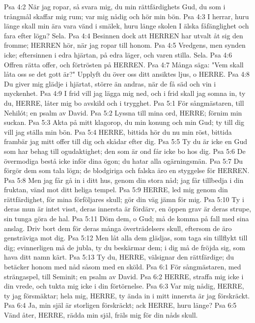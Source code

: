 Psa 4:2  När jag ropar, så svara mig, du min rättfärdighets Gud, du som i trångmål skaffar mig rum; var mig nådig och hör min bön.
Psa 4:3  I herrar, huru länge skall min ära vara vänd i smälek, huru länge skolen I älska fåfänglighet och fara efter lögn? Sela.
Psa 4:4  Besinnen dock att HERREN har utvalt åt sig den fromme; HERREN hör, när jag ropar till honom.
Psa 4:5  Vredgens, men synden icke; eftersinnen i edra hjärtan, på edra läger, och varen stilla. Sela.
Psa 4:6  Offren rätta offer, och förtrösten på HERREN.
Psa 4:7  Många säga: "Vem skall låta oss se det gott är?" Upplyft du över oss ditt ansiktes ljus, o HERRE.
Psa 4:8  Du giver mig glädje i hjärtat, större än andras, när de få säd och vin i myckenhet.
Psa 4:9  I frid vill jag lägga mig ned, och i frid skall jag somna in, ty du, HERRE, låter mig bo avskild och i trygghet.
Psa 5:1  För sångmästaren, till Nehilót; en psalm av David.
Psa 5:2  Lyssna till mina ord, HERRE; förnim min suckan.
Psa 5:3  Akta på mitt klagorop, du min konung och min Gud; ty till dig vill jag ställa min bön.
Psa 5:4  HERRE, bittida hör du nu min röst, bittida frambär jag mitt offer till dig och skådar efter dig.
Psa 5:5  Ty du är icke en Gud som har behag till ogudaktighet; den som är ond får icke bo hos dig.
Psa 5:6  De övermodiga bestå icke inför dina ögon; du hatar alla ogärningsmän.
Psa 5:7  Du förgör dem som tala lögn; de blodgiriga och falska äro en styggelse för HERREN.
Psa 5:8  Men jag får gå in i ditt hus, genom din stora nåd; jag får tillbedja i din fruktan, vänd mot ditt heliga tempel.
Psa 5:9  HERRE, led mig genom din rättfärdighet, för mina förföljares skull; gör din väg jämn för mig.
Psa 5:10  Ty i deras mun är intet visst, deras innersta är fördärv, en öppen grav är deras strupe, sin tunga göra de hal.
Psa 5:11  Döm dem, o Gud; må de komma på fall med sina anslag. Driv bort dem för deras många överträdelsers skull, eftersom de äro gensträviga mot dig.
Psa 5:12  Men låt alla dem glädjas, som taga sin tillflykt till dig; evinnerligen må de jubla, ty du beskärmar dem; i dig må de fröjda sig, som hava ditt namn kärt.
Psa 5:13  Ty du, HERRE, välsignar den rättfärdige; du betäcker honom med nåd såsom med en sköld.
Psa 6:1  För sångmästaren, med strängaspel, till Seminit; en psalm av David.
Psa 6:2  HERRE, straffa mig icke i din vrede, och tukta mig icke i din förtörnelse.
Psa 6:3  Var mig nådig, HERRE, ty jag försmäktar; hela mig, HERRE, ty ända in i mitt innersta är jag förskräckt.
Psa 6:4  Ja, min själ är storligen förskräckt; ack HERRE, huru länge?
Psa 6:5  Vänd åter, HERRE, rädda min själ, fräls mig för din nåds skull.
